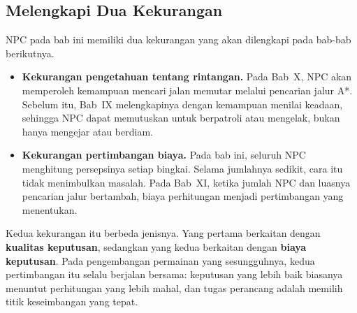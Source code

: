 \subsection{Melengkapi Dua Kekurangan}

NPC pada bab ini memiliki dua kekurangan yang akan dilengkapi pada bab-bab
berikutnya.

\begin{itemize}
  \item \textbf{Kekurangan pengetahuan tentang rintangan.} Pada Bab~X, NPC
        akan memperoleh kemampuan mencari jalan memutar melalui pencarian jalur
        A*. Sebelum itu, Bab~IX melengkapinya dengan kemampuan menilai
        keadaan, sehingga NPC dapat memutuskan untuk berpatroli atau mengelak,
        bukan hanya mengejar atau berdiam.
  \item \textbf{Kekurangan pertimbangan biaya.} Pada bab ini, seluruh NPC
        menghitung persepsinya setiap bingkai. Selama jumlahnya sedikit, cara
        itu tidak menimbulkan masalah. Pada Bab~XI, ketika jumlah NPC dan
        luasnya pencarian jalur bertambah, biaya perhitungan menjadi
        pertimbangan yang menentukan.
\end{itemize}

\begin{catatabox}
Kedua kekurangan itu berbeda jenisnya. Yang pertama berkaitan
dengan \textbf{kualitas keputusan}, sedangkan yang kedua berkaitan dengan
\textbf{biaya keputusan}. Pada pengembangan permainan yang sesungguhnya, kedua
pertimbangan itu selalu berjalan bersama: keputusan yang lebih baik biasanya
menuntut perhitungan yang lebih mahal, dan tugas perancang adalah memilih
titik keseimbangan yang tepat.
\end{catatabox}
